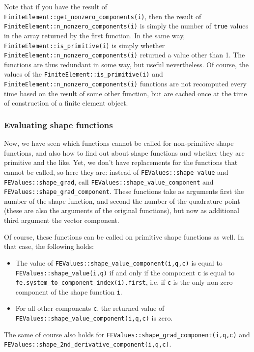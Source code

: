 \documentclass{article}
\begin{document}
Note that if you have the result of
\texttt{FiniteElement::get\_\-nonzero\_\-components(i)}, then the result of
\texttt{FiniteElement::n\_nonzero\_components(i)} is simply the number of
\texttt{true} values in the array returned by the first function. In the same
way,
\texttt{FiniteElement::\-is\_primitive(i)} is simply whether
\texttt{FiniteElement::\-n\_nonzero\_\-components(i)} returned a value other than
1. The functions are thus redundant in some way, but useful nevertheless. Of
course, the values of the  \texttt{FiniteElement::\-is\_primitive(i)}
and  \texttt{FiniteElement::n\_nonzero\_components(i)} functions are not
recomputed every time based on the result of some other function, but are
cached once at the time of construction of a finite element object.


\subsubsection*{Evaluating shape functions}

Now, we have seen which functions cannot be called for non-primitive shape
functions, and also how to find out about shape functions and whether they are
primitive and the like. Yet, we don't have replacements for the functions that
cannot be called, so here they are: instead of \texttt{FEValues::shape\_value}
and \texttt{FEValues::shape\_grad}, call
\texttt{FEValues::shape\_value\_component} and
\texttt{FEValues::shape\_grad\_component}. These functions take as arguments
first the number of the shape function, and second the number of the
quadrature point (these are also the arguments of the original functions), but
now as additional third argument the vector component.

Of course, these functions can be called on primitive shape functions as
well. In that case, the following holds:
\begin{itemize}
\item The value of \texttt{FEValues::shape\_value\_component(i,q,c)} is equal
  to \texttt{FEValues::\-shape\_value(i,q)} if and only if the component
  \texttt{c} is equal to \texttt{fe.system\_to\_\-component\_\-index(i).first},
  i.e. if \texttt{c} is the only non-zero component of the shape function
  \texttt{i}.
\item For all other components \texttt{c}, the returned value of
  \texttt{FEValues::shape\_\-value\_\-component(i,q,c)} is zero.
\end{itemize}
The same of course also holds for
\texttt{FEValues::shape\_grad\_component(i,q,c)} and
\texttt{FEValues::shape\_2nd\_derivative\_component(i,q,c)}.
\end{document}
